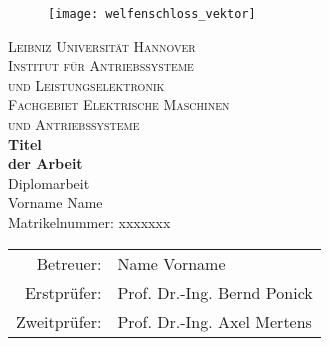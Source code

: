 \begin{titlepage}
\enlargethispage{2.0cm}

\begin{center}

\vspace*{-2cm}


   \begin{figure}[h]
   \centering
       \texttt{[image: welfenschloss\_vektor]}
   \end{figure}

\vspace{1cm}

    {\LARGE \textsc{Leibniz Universität Hannover}}\\[1.0cm]

    {\Large \textsc{Institut für Antriebssysteme}} \\[0.2cm]
    {\Large \textsc{und Leistungselektronik}} \\ [0.4cm]

    {\Large \textsc{Fachgebiet Elektrische Maschinen}} \\ [0.2cm]
		{\Large \textsc{und Antriebssysteme}} \\ [1.7cm]

    {\Large \textbf{Titel \\[0.3cm] der Arbeit} } \\ [3cm]

    {\Large Diplomarbeit} \\ [1.5cm]

    {\large Vorname Name} \\
    {Matrikelnummer: xxxxxxx } \\ [1.5cm]

    \begin{tabular}{rl}
      Betreuer:    & Name Vorname\\
      Erstprüfer:  & Prof. Dr.-Ing. Bernd Ponick\\
      Zweitprüfer: & Prof. Dr.-Ing. Axel Mertens
    \end{tabular}

\end{center}

\end{titlepage}
